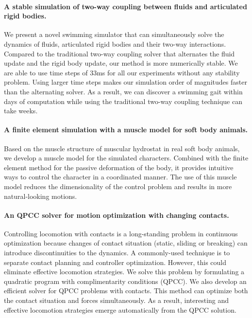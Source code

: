 \paragraph{A stable simulation of two-way coupling between fluids and articulated rigid bodies.} We present a novel swimming simulator that can simultaneously solve the dynamics of fluids, articulated rigid bodies and their two-way interactions. Compared to the traditional two-way coupling solver that alternates the fluid update and the rigid body update, our method is more numerically stable. We are able to use time steps of 33ms for all our experiments without any stability problem. Using larger time steps makes our simulation order of magnitudes faster than the alternating solver. As a result, we can discover a swimming gait within days of computation while using the traditional two-way coupling technique can take weeks.

\paragraph{A finite element simulation with a muscle model for soft body animals.} Based on the muscle structure of muscular hydrostat \cite{} in real soft body animals, we develop a muscle model for the simulated characters. Combined with the finite element method for the passive deformation of the body, it provides intuitive ways to control the character in a coordinated manner. The use of this muscle model reduces the dimensionality of the control problem and results in more natural-looking motions.

\paragraph{An QPCC solver for motion optimization with changing contacts.} Controlling locomotion with contacts is a long-standing problem in continuous optimization because changes of contact situation (static, sliding or breaking) can introduce discontinuities to the dynamics. A commonly-used technique is to separate contact planning and controller optimization. However, this could eliminate effective locomotion strategies. We solve this problem by formulating a quadratic program with complimentarity conditions (QPCC). We also develop an efficient solver for QPCC problems with contacts. This method can optimize both the contact situation and forces simultaneously. As a result, interesting and effective locomotion strategies emerge automatically from the QPCC solution.

